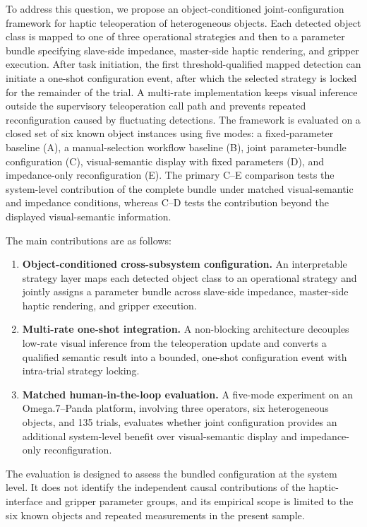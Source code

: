 To address this question, we propose an object-conditioned joint-configuration framework for haptic teleoperation of heterogeneous objects. Each detected object class is mapped to one of three operational strategies and then to a parameter bundle specifying slave-side impedance, master-side haptic rendering, and gripper execution. After task initiation, the first threshold-qualified mapped detection can initiate a one-shot configuration event, after which the selected strategy is locked for the remainder of the trial. A multi-rate implementation keeps visual inference outside the supervisory teleoperation call path and prevents repeated reconfiguration caused by fluctuating detections. The framework is evaluated on a closed set of six known object instances using five modes: a fixed-parameter baseline (A), a manual-selection workflow baseline (B), joint parameter-bundle configuration (C), visual-semantic display with fixed parameters (D), and impedance-only reconfiguration (E). The primary C--E comparison tests the system-level contribution of the complete bundle under matched visual-semantic and impedance conditions, whereas C--D tests the contribution beyond the displayed visual-semantic information.

The main contributions are as follows:

\begin{enumerate}
\item \textbf{Object-conditioned cross-subsystem configuration.} An interpretable strategy layer maps each detected object class to an operational strategy and jointly assigns a parameter bundle across slave-side impedance, master-side haptic rendering, and gripper execution.
\item \textbf{Multi-rate one-shot integration.} A non-blocking architecture decouples low-rate visual inference from the teleoperation update and converts a qualified semantic result into a bounded, one-shot configuration event with intra-trial strategy locking.
\item \textbf{Matched human-in-the-loop evaluation.} A five-mode experiment on an Omega.7--Panda platform, involving three operators, six heterogeneous objects, and 135 trials, evaluates whether joint configuration provides an additional system-level benefit over visual-semantic display and impedance-only reconfiguration.
\end{enumerate}

The evaluation is designed to assess the bundled configuration at the system level. It does not identify the independent causal contributions of the haptic-interface and gripper parameter groups, and its empirical scope is limited to the six known objects and repeated measurements in the present sample.
